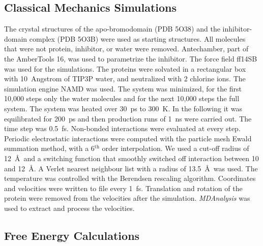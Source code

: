 \documentclass[12pt, english, letter]{article}
\begin{document}
	\subsection{Classical Mechanics Simulations}
	
	The crystal structures of the apo-bromodomain (PDB 5O38)\autocite{Runcie2018} and the inhibitor-domain complex (PDB 5O3B)\autocite{Runcie2018} were used as starting structures. All molecules that were not protein, inhibitor, or water were removed. Antechamber, part of the AmberTools 16\autocite{Case2017}, was used to parametrize the inhibitor. The force field ff14SB\autocite{Maier2015} was used for the simulations. The proteins were solvated in a rectangular box with 10~Angstrom of TIP3P\autocite{Jorgensen1983} water, and neutralized with 2 chlorine ions. The simulation engine NAMD\autocite{Phillips2005} was used. The system was minimized, for the first 10,000 steps only the water molecules and for the next 10,000 steps the full system. The system was heated over 30~ps to 300~K. In the following it was equilibrated for 200~ps and then production runs of 1~ns were carried out. The time step was 0.5~fs. Non-bonded interactions were evaluated at every step. Periodic electrostatic interactions were computed with the particle mesh Ewald summation method, with a 6$^\mathrm{th}$ order interpolation. We used a cut-off radius of 12~\AA\, and a switching function that smoothly switched off interaction between 10 and 12~\AA. A Verlet nearest neighbour list with a radius of 13.5~\AA\, was used. The temperature was controlled with the Berendsen rescaling algorithm\autocite{Berendsen1984}. Coordinates and velocities were written to file every 1~fs. Translation and rotation of the protein were removed from the velocities after the simulation. \emph{MDAnalysis} \autocite{MDAnalysis1, MDAnalysis2} was used to extract and process the velocities.
	
	\subsection{Free Energy Calculations}
	
\end{document}
